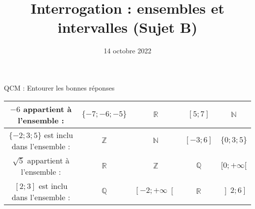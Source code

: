 \documentclass[
	classe=$2^{de}$,
	headerTitle=Interrogation\space Chapitre\space 2
]{évaluation}
\title{Interrogation : ensembles et intervalles (Sujet B)}
\date{14 octobre 2022}
\newcommand{\intervalle}[4]{\left#1 #2;#3\right#4}
\newcommand{\correctionEntoure}[1]{%
\ifdefined\makeCorrection%
\squared[red]{#1}
\else%
#1
\fi}
\begin{document}
\maketitle

\begin{exercice} QCM : Entourer les bonnes réponses \vspace{1em}

	\begin{center}
		\begin{tabular}{|c|c|c|c|c|}
			\hline
			$-6$ appartient à l'ensemble :                        & \correctionEntoure{$\{-7; -6;-5\}$} & \correctionEntoure{$ℝ$}                         & $\intervalle{[}{5}{7}{]}$                      & $ℕ$                           \\ \hline
			$\{-2; 3; 5\}$ est inclu dans l'ensemble :            & \correctionEntoure{$ℤ$}             & $ℕ$                                             & \correctionEntoure{$\intervalle{[}{-3}{6}{]}$} & $\{0; 3; 5\}$                 \\ \hline
			$\sqrt{5}$ appartient à l'ensemble :                  & \correctionEntoure{$ℝ$}             & $ℤ$                                             & $ℚ$                                            & \correctionEntoure{$[0; +∞[$} \\ \hline
			$\intervalle{[}{2}{3}{]}$ est inclu dans l'ensemble : & $ℚ$                                 & \correctionEntoure{$\intervalle{[}{-2}{+∞}{[}$} & \correctionEntoure{$ℝ$}                        & $\intervalle{]}{2}{6}{]}$     \\ \hline
		\end{tabular}
	\end{center}
\end{exercice}
\end{document}
